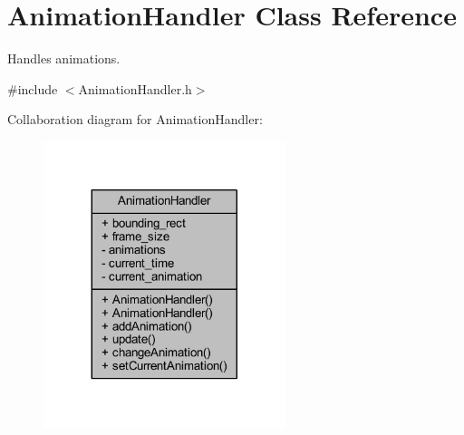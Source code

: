 \hypertarget{class_animation_handler}{\section{Animation\+Handler Class Reference}
\label{class_animation_handler}
}


Handles animations.  




{\ttfamily \#include $<$Animation\+Handler.\+h$>$}



Collaboration diagram for Animation\+Handler\+:
\nopagebreak
\begin{figure}[H]
\begin{center}
\leavevmode
\includegraphics[width=200pt]{class_animation_handler__coll__graph}
\end{center}
\end{figure}
